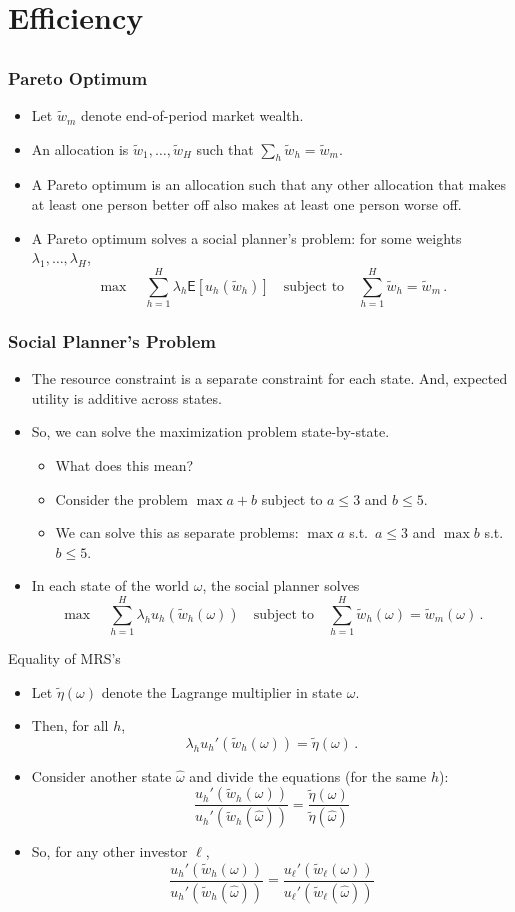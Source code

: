 \documentclass[10pt]{beamer}
\newcommand{\bi}{\begin{itemize}}
\newcommand{\ei}{\end{itemize}}
\newcommand{\im}{\item}
\newcommand{\mye}{\ensuremath{\mathsf{E}}}
\newcommand{\bfr}{\begin{frame}}
\newcommand{\tw}{\tilde{w}}
\begin{document}
  \section{Efficiency}\subsection{}
  
  \bfr\frametitle{Pareto Optimum}
  \bi 
   \im Let $\tw_m$ denote end-of-period market wealth.
   \im   An allocation is $\tw_1, \ldots, \tw_H$ such that $\sum_h \tw_h = \tw_m$.
  \im   A Pareto optimum is an allocation such that any other allocation that makes at least one person better off also makes at least one person worse off.
  \im 
  A Pareto optimum solves a social planner's problem: for some weights $\lambda_1, \ldots, \lambda_H$, 
  $$\max \quad \sum_{h=1}^H \lambda_h\mye [u_h(\tw_h)] \quad \text{subject to} \quad \sum_{h=1}^H \tw_h = \tw_m\,.$$
  \ei 
  \end{frame}
  
  \bfr\frametitle{Social Planner's Problem}
  \bi 
  \im The resource constraint is a separate constraint for each state.  And, expected utility is additive across states.
  \im So, we can solve the maximization problem state-by-state.  
  \bi 
  \im   What does this mean?  
  \im Consider the problem $\max a + b$ subject to $a\le 3$ and $b\le 5$. 
  \im  We can solve this as separate problems: $\max a$ s.t.\ $a \le 3$ and $\max b$ s.t.\ $b\le 5$.
  \ei
  \im 
  In each state of the world $\omega$, the social planner solves
  $$\max \quad \sum_{h=1}^H \lambda_hu_h(\tw_h(\omega)) \quad \text{subject to} \quad \sum_{h=1}^H \tw_h(\omega) = \tw_m(\omega)\,.$$
    \ei
  \end{frame}
  
  \begin{frame}{Equality of MRS's}
    \bi 
    \im 
  Let $\tilde{\eta}(\omega)$ denote the Lagrange multiplier in state $\omega$.  
  \im Then, for all $h$,
  $$\lambda_h u_h'(\tw_h(\omega)) = \tilde{\eta}(\omega)\,.$$
    \im Consider another state $\hat\omega$ and divide the equations (for the same $h$):
    $$\frac{u_h'(\tw_h(\omega))}{u_h'(\tw_h(\hat \omega))} = \frac{\tilde\eta(\omega)}{\tilde\eta(\hat\omega)}$$
    \im So, for any other investor $\ell$,
    $$\frac{u_h'(\tw_h(\omega))}{u_h'(\tw_h(\hat\omega))} = \frac{u_\ell'(\tw_\ell(\omega))}{u_\ell'(\tw_\ell(\hat\omega))}$$
    \ei
  \end{frame}
\end{document}
